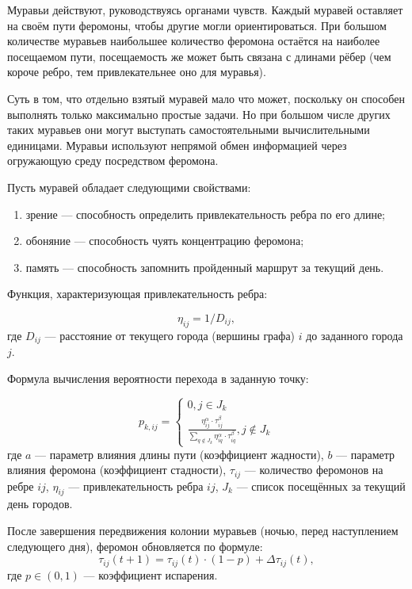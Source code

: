 Муравьи действуют, руководствуясь органами чувств. 
Каждый муравей оставляет на своём пути феромоны, чтобы другие могли ориентироваться. 
При большом количестве муравьев наибольшее количество феромона остаётся на наиболее посещаемом пути, посещаемость же может быть связана с длинами рёбер (чем короче ребро, тем привлекательнее оно для муравья).

Суть в том, что отдельно взятый муравей мало что может, поскольку он способен выполнять только максимально простые задачи. Но при большом числе других таких муравьев они могут выступать самостоятельными вычислительными единицами. Муравьи используют непрямой обмен информацией через огружающую среду посредством феромона.

Пусть муравей обладает следующими свойствами:
\begin{enumerate}[label=\arabic*)]
	\item зрение --- способность определить привлекательность ребра по его длине;
	\item обоняние --- способность чуять концентрацию феромона;
        \item память --- способность запомнить пройденный маршрут за текущий день.
\end{enumerate}


Функция, характеризующая привлекательность ребра:

\begin{equation}
	\label{d_func}
	\eta_{ij} = 1 / D_{ij},
\end{equation}
где $D_{ij}$ — расстояние от текущего города (вершины графа) $i$ до заданного города $j$.


Формула вычисления вероятности перехода в заданную точку:

\begin{equation}
	\label{posib}
	p_{k,ij} = \begin{cases}
        0, j \in J_k \\
		\frac{\eta_{ij}^{\alpha}\cdot\tau_{ij}^{\beta}}{\sum_{q\notin J_k} \eta^\alpha_{iq}\cdot\tau^\beta_{iq}}, j \notin J_k
	\end{cases}
\end{equation}
где $a$ --- параметр влияния длины пути (коэффициент жадности), $b$ --- параметр влияния феромона (коэффициент стадности), $\tau_{ij}$ --- количество феромонов на ребре $ij$, $\eta_{ij}$ --- привлекательность ребра $ij$, $J_k$ --- список посещённых за текущий день городов.

После завершения передвижения колонии муравьев (ночью, перед наступлением следующего дня), феромон обновляется по формуле:
\begin{equation}
	\label{update_phero_1}
	\tau_{ij}(t+1) = \tau_{ij}(t)\cdot(1-p) + \Delta \tau_{ij}(t),
\end{equation}
где $p \in (0, 1)$ --- коэффициент испарения.

